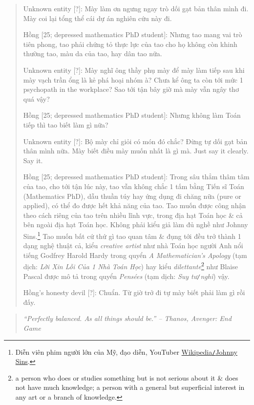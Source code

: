 \documentclass[12pt]{article}
\begin{document}
\begin{quote}
	{\sf Unknown entity [?]}: Mày làm ơn ngưng ngay trò dối gạt bản thân mình đi. Mày coi lại tổng thể cái dự án nghiên cứu này đi.
	
	{\sf Hồng [25; depressed mathematics PhD student]}: Nhưng tao mang vai trò tiên phong, tao phải chứng tỏ thực lực của tao cho họ không còn khinh thường tao, màu da của tao, hay dân tao nữa.
	
	{\sf Unknown entity [?]}: Mày nghĩ ông thầy phụ mày để mày làm tiếp sau khi mày vạch trần ổng là kẻ phá hoại nhóm à? Chưa kể ông ta còn tới mức 1 psychopath in the workplace? Sao tới tận bây giờ mà mày vẫn ngây thơ quá vậy?
	
	{\sf Hồng [25; depressed mathematics PhD student]}: Nhưng không làm Toán tiếp thì tao biết làm gì nữa?
	
	{\sf Unknown entity [?]}: Bộ mày chỉ giỏi có món đó chắc? Đừng tự dối gạt bản thân mình nữa. Mày biết điều mày muốn nhất là gì mà. Just say it clearly. Say it.
	
	{\sf Hồng [25; depressed mathematics PhD student]}: Trong sâu thẳm thâm tâm của tao, cho tới tận lúc này, tao vẫn không chắc 1 tấm bằng Tiến sĩ Toán (Mathematics PhD), dẫu thuần túy hay ứng dụng đi chăng nữa (pure or applied), có thể đo được hết khả năng của tao. Tao muốn được công nhận theo cách riêng của tao trên nhiều lĩnh vực, trong địa hạt Toán học \& cả bên ngoài địa hạt Toán học. Không phải kiểu giả làm đủ nghề như {\sc Johnny Sins}.\footnote{Diễn viên phim người lớn của Mỹ, đạo diễn, YouTuber \href{https://en.wikipedia.org/wiki/Johnny_Sins}{Wikipedia{\tt/}Johnny Sins}.} Tao muốn bất cứ thứ gì tao quan tâm \& đụng tới đều trở thành 1 dạng nghệ thuật cả, kiểu {\it creative artist} như nhà Toán học người Anh nổi tiếng {\sc Godfrey Harold Hardy} trong quyển {\it A Mathematician's Apology} \cite{Hardy1940,Hardy1992,Hardy2022} (tạm dịch: {\it Lời Xin Lỗi Của 1 Nhà Toán Học}) hay kiểu {\it dilettante}\footnote{\sf a person who does or studies something but is not serious about it \& does not have much knowledge; a person with a general but superficial interest in any art or a branch of knowledge.} như {\sc Blaise Pascal} được mô tả trong quyển {\it Pens\'ees} \cite{Pascal_pensees} (tạm dịch: {\it Suy tư{\tt/}nghĩ}) vậy.
	
	{\sf Hồng's honesty devil [?]}: Chuẩn. Từ giờ trở đi tự mày biết phải làm gì rồi đấy.
\end{quote}

\begin{quotation}\it
	``Perfectly balanced. As all things should be.'' -- {\sc Thanos}, Avenger: End Game
\end{quotation}
\end{document}
